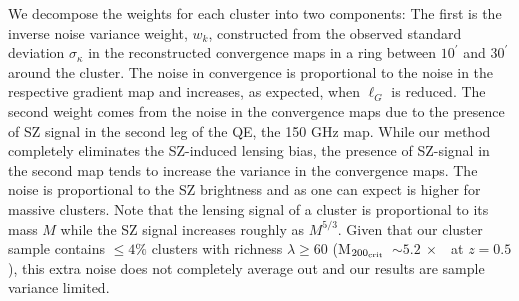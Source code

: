 \documentclass[usenatbib, twocolumn, nofootinbib, reprint]{aastex61}
\newcommand{\pending}[1]{\textcolor{red}{#1}}
\newcommand{\mvir}{M$_{200_{\rm crit}}$}
\begin{document}
We decompose the weights for each cluster into two components: 
The first is the inverse noise variance weight, $w_{k}$, constructed from the observed standard deviation $\sigma_{\kappa}$ in the reconstructed \sptpol{} convergence maps in a ring between $10^{\prime}$ and $30^{\prime}$ around the cluster. 
The noise in convergence is proportional to the noise in the respective gradient map and increases, as expected, when $\ell_{G}$ is reduced.
The second weight comes from the noise in the convergence maps due to the presence of SZ signal in the second leg of the QE, the \sptpol{} 150 GHz map.
While our method completely eliminates the SZ-induced lensing bias, the presence of SZ-signal in the second map tends to increase the variance in the convergence maps. 
The noise is proportional to the SZ brightness and as one can expect is higher for massive clusters.
Note that the lensing signal of a cluster is proportional to its mass $M$ while the SZ signal increases roughly as $M^{5/3}$.
Given that our cluster sample contains $\le 4\%$ clusters with richness $\lambda \ge 60$ (\mbox{\mvir\ $\sim 5.2\ \times$ \munits} at $z=0.5$), this extra noise does not completely average out and our results are sample variance limited.
\end{document}
